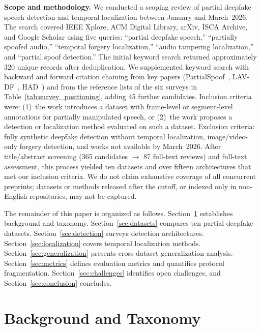 \documentclass[journal]{IEEEtran}
\begin{document}
\textbf{Scope and methodology.} We conducted a scoping review of partial deepfake speech detection and temporal localization between January and March~2026. The search covered IEEE Xplore, ACM Digital Library, arXiv, ISCA Archive, and Google Scholar using five queries: ``partial deepfake speech,'' ``partially spoofed audio,'' ``temporal forgery localization,'' ``audio tampering localization,'' and ``partial spoof detection.'' The initial keyword search returned approximately 320 unique records after deduplication. We supplemented keyword search with backward and forward citation chaining from key papers (PartialSpoof~\cite{zhang2023partialspoof}, LAV-DF~\cite{cai2022lavdf}, HAD~\cite{yi2021had}) and from the reference lists of the six surveys in Table~\ref{tab:survey_positioning}, adding 45 further candidates. Inclusion criteria were: (1)~the work introduces a dataset with frame-level or segment-level annotations for partially manipulated speech, or (2)~the work proposes a detection or localization method evaluated on such a dataset. Exclusion criteria: fully synthetic deepfake detection without temporal localization, image/video-only forgery detection, and works not available by March~2026. After title/abstract screening (365 candidates $\rightarrow$ 87 full-text reviews) and full-text assessment, this process yielded ten datasets and over fifteen architectures that met our inclusion criteria. We do not claim exhaustive coverage of all concurrent preprints; datasets or methods released after the cutoff, or indexed only in non-English repositories, may not be captured.

The remainder of this paper is organized as follows. Section~\ref{sec:background} establishes background and taxonomy. Section~\ref{sec:datasets} compares ten partial deepfake datasets. Section~\ref{sec:detection} surveys detection architectures. Section~\ref{sec:localization} covers temporal localization methods. Section~\ref{sec:generalization} presents cross-dataset generalization analysis. Section~\ref{sec:metrics} defines evaluation metrics and quantifies protocol fragmentation. Section~\ref{sec:challenges} identifies open challenges, and Section~\ref{sec:conclusion} concludes.


\section{Background and Taxonomy}
\label{sec:background}
\end{document}
